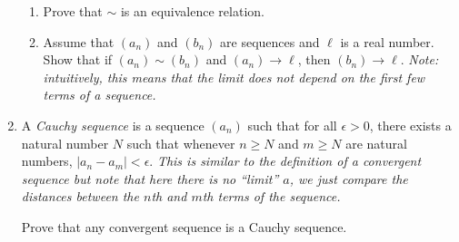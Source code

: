 \documentclass{amsart}
\theoremstyle{definition}
\begin{document}
\begin{enumerate}
  \begin{enumerate}
  \item Prove that $\sim$ is an equivalence relation.
  \item Assume that $(a_n)$ and $(b_n)$ are sequences and $\ell$ is a real number. Show that if $(a_n) \sim (b_n)$ and $(a_n) \to \ell$, then $(b_n) \to \ell$. \emph{Note: intuitively, this means that the limit does not depend on the first few terms of a sequence.}
  \end{enumerate}

\item A \emph{Cauchy sequence} is a sequence $(a_n)$ such that for all $\epsilon > 0$, there exists a natural number $N$ such that whenever $n \ge N$ and $m \ge N$ are natural numbers, $|a_n - a_m| < \epsilon$. \emph{This is similar to the definition of a convergent sequence but note that here there is no ``limit'' $a$, we just compare the distances between the $n$th and $m$th terms of the sequence.}

  Prove that any convergent sequence is a Cauchy sequence.
\end{enumerate}



\end{document}
